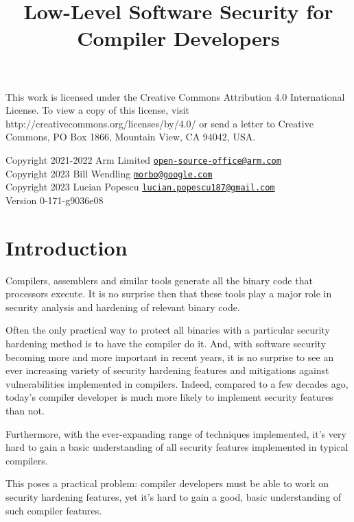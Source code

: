 \documentclass[
  a4paper,
]{report}
\title{Low-Level Software Security for Compiler Developers}
\author{}
\date{}
\begin{document}
\maketitle

\clearpage

\vspace*{\fill}
This work is licensed under the Creative Commons Attribution 4.0 International
License. To view a copy of this license, visit
http://creativecommons.org/licenses/by/4.0/ or send a letter to Creative
Commons, PO Box 1866, Mountain View, CA 94042, USA.

  Copyright 2021-2022 Arm Limited
\href{mailto:open-source-office@arm.com}{\nolinkurl{open-source-office@arm.com}}\\
  Copyright 2023 Bill Wendling
\href{mailto:morbo@google.com}{\nolinkurl{morbo@google.com}}\\
  Copyright 2023 Lucian Popescu
\href{mailto:lucian.popescu187@gmail.com}{\nolinkurl{lucian.popescu187@gmail.com}}\\

Version 0-171-g9036e08
\clearpage

{
\hypersetup{linkcolor=}
\setcounter{tocdepth}{2}
\tableofcontents
}
\hypertarget{introduction}{%
\chapter{Introduction}\label{introduction}}

Compilers, assemblers and similar tools generate all the binary code
that processors execute. It is no surprise then that these tools play a
major role in security analysis and hardening of relevant binary code.

Often the only practical way to protect all binaries with a particular
security hardening method is to have the compiler do it. And, with
software security becoming more and more important in recent years, it
is no surprise to see an ever increasing variety of security hardening
features and mitigations against vulnerabilities implemented in
compilers. Indeed, compared to a few decades ago, today's compiler
developer is much more likely to implement security features than not.

Furthermore, with the ever-expanding range of techniques implemented,
it's very hard to gain a basic understanding of all security features
implemented in typical compilers.

This poses a practical problem: compiler developers must be able to work
on security hardening features, yet it's hard to gain a good, basic
understanding of such compiler features.
\end{document}
